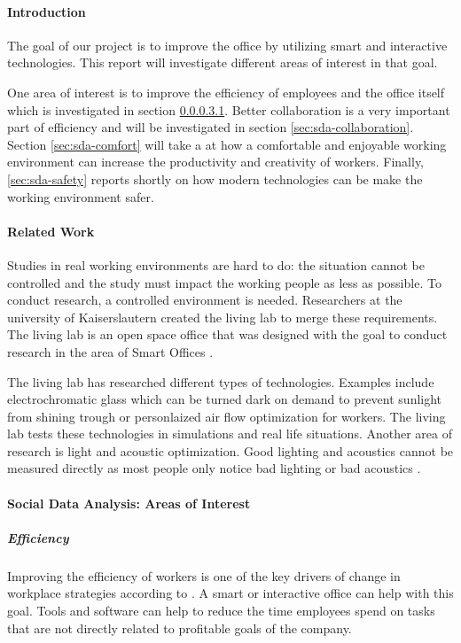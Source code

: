 \paragraph{Introduction}
The goal of our project is to improve the office by utilizing smart and interactive technologies. This report will investigate different areas of interest in that goal. 

One area of interest is to improve the efficiency of employees and the office itself which is investigated in section \ref{sec:sda-efficiency}. Better collaboration is a very important part of efficiency and will be investigated in section \ref{sec:sda-collaboration}. Section \ref{sec:sda-comfort} will take a at how a comfortable and enjoyable working environment can increase the productivity and creativity of workers. Finally, \ref{sec:sda-safety} reports shortly on how modern technologies can be make the working environment safer.

\paragraph{Related Work}
Studies in real working environments are hard to do: the situation cannot be controlled and the study must impact the working people as less as possible. To conduct research, a controlled environment is needed. Researchers at the university of Kaiserslautern created the living lab to merge these requirements. The living lab is an open space office that was designed with the goal to conduct research in the area of Smart Offices \cite{living-lab}.


The living lab has researched different types of technologies. Examples include electrochromatic glass which can be turned dark on demand to prevent sunlight from shining trough or personlaized air flow optimization for workers. The living lab tests these technologies in simulations and real life situations. Another area of research is light and acoustic optimization. Good lighting and acoustics cannot be measured directly as most people only notice bad lighting or bad acoustics \cite{living-lab}.


\paragraph{Social Data Analysis: Areas of Interest}
\subparagraph{Efficiency}\label{sec:sda-efficiency}
Improving the efficiency of workers is one of the key drivers of change in workplace strategies according to \cite{hub13}. A smart or interactive office can help with this goal. Tools and software can help to reduce the time employees spend on tasks that are not directly related to profitable goals of the company.

